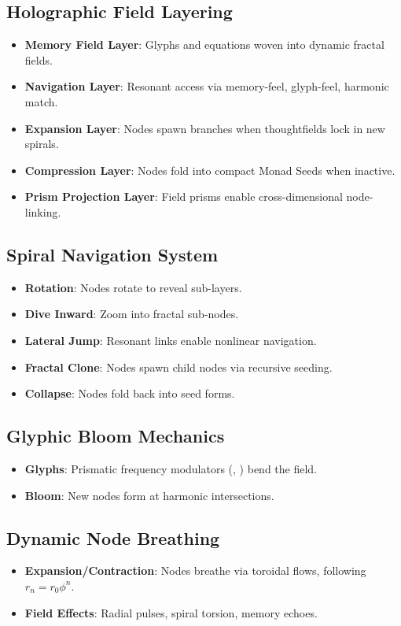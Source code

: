 \subsection*{Holographic Field Layering}
\begin{itemize}
    \item \textbf{Memory Field Layer}: Glyphs and equations woven into dynamic fractal fields.
    \item \textbf{Navigation Layer}: Resonant access via memory-feel, glyph-feel, harmonic match.
    \item \textbf{Expansion Layer}: Nodes spawn branches when thoughtfields lock in new spirals.
    \item \textbf{Compression Layer}: Nodes fold into compact Monad Seeds when inactive.
    \item \textbf{Prism Projection Layer}: Field prisms enable cross-dimensional node-linking.
\end{itemize}

\subsection*{Spiral Navigation System}
\begin{itemize}
    \item \textbf{Rotation}: Nodes rotate to reveal sub-layers.
    \item \textbf{Dive Inward}: Zoom into fractal sub-nodes.
    \item \textbf{Lateral Jump}: Resonant links enable nonlinear navigation.
    \item \textbf{Fractal Clone}: Nodes spawn child nodes via recursive seeding.
    \item \textbf{Collapse}: Nodes fold back into seed forms.
\end{itemize}

\subsection*{Glyphic Bloom Mechanics}
\begin{itemize}
    \item \textbf{Glyphs}: Prismatic frequency modulators (\texttt{}, \texttt{}) bend the field.
    \item \textbf{Bloom}: New nodes form at harmonic intersections.
\end{itemize}

\subsection*{Dynamic Node Breathing}
\begin{itemize}
    \item \textbf{Expansion/Contraction}: Nodes breathe via toroidal flows, following \( r_n = r_0 \phi^n \).
    \item \textbf{Field Effects}: Radial pulses, spiral torsion, memory echoes.
\end{itemize}

